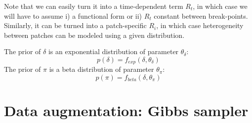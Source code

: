 \documentclass[a4paper,11pt]{article}
\begin{document}
Note that we can easily turn it into a time-dependent term $R_t$, in which 
case 
we will have to assume i) a functional form or ii) $R_t$ constant 
between break-points. 
Similarly, it can be turned into a patch-specific $R_i$, in which case 
heterogeneity between patches can be modeled using a given distribution.
% 


The prior of $\delta$ is an exponential distribution of parameter 
$\theta_{\delta}$:
\begin{equation}
p(\delta) = f_{exp}(\delta,  \theta_{\delta})
\end{equation}
The prior of $\pi$ is a beta distribution of parameter 
$\theta_{\pi}$:
\begin{equation}
p(\pi) = f_{beta}(\delta,  \theta_{\pi})
\end{equation}





\section{Data augmentation: Gibbs sampler}
\end{document}
